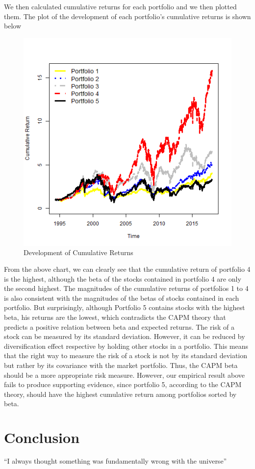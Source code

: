 \documentclass[12pt,a4paper,abstracton,fleqn]{article}
\begin{document}
\begin{justify}
We then calculated cumulative returns for each portfolio and we then plotted them. The plot of the development of each portfolio’s cumulative returns is shown below
\begin{figure}[H]
\centering
\includegraphics[width=1\textwidth,height=0.9\textwidth]{Cumulative Returns}
\caption{Development of Cumulative Returns}
\label{fig:Development of Cumulative Returns}
\end{figure}




From the above chart, we can clearly see that the cumulative return of portfolio 4 is the highest, although the beta of the stocks contained in portfolio 4 are only the second highest. The magnitudes of the cumulative returns of portfolios 1 to 4 is also consistent with the magnitudes of the betas of stocks contained in each portfolio. But surprisingly, although Portfolio 5 contains stocks with the highest beta, his returns are the lowest, which contradicts the CAPM theory that predicts a positive relation between beta and expected returns.
The risk of a stock can be measured by its standard deviation. However, it can be reduced by diversification effect respective by holding other stocks in a portfolio. This means that the right way to measure the risk of a stock is not by its standard deviation but rather by its covariance with the market portfolio. Thus, the CAPM beta should be a more appropriate risk measure.  However, our empirical result above fails to produce supporting evidence,  since portfolio 5, according to the CAPM theory, should have the highest cumulative return among portfolios sorted by beta.


\section{Conclusion}
``I always thought something was fundamentally wrong with the universe'' \citep{adams1995hitchhiker}
\end{justify}
\end{document}
